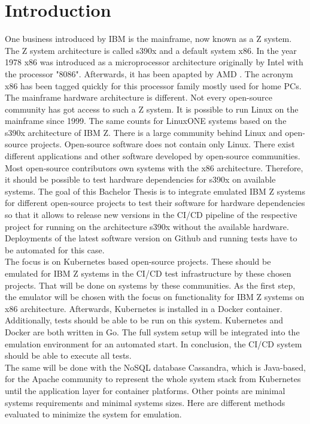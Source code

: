 \chapter{Introduction}\label{ch:intro}

One business introduced by IBM is the mainframe, now known as a Z system. The Z system architecture is called \gls{s390x} and a default system \gls{x86}. 
In the year 1978 x86 was introduced as a microprocessor architecture originally by Intel with the processor "8086". Afterwards, it has been apapted by AMD \cite{Ostler2020}. The acronym x86 has been tagged quickly for this processor family mostly used for home PCs. 
The mainframe hardware architecture is different. Not every open-source community has got access to such a Z system. It is possible to run Linux on the mainframe since 1999. The same counts for LinuxONE systems based on the s390x architecture of IBM Z. There is a large community behind Linux and open-source projects. Open-source software does not contain only \gls{Linux}. There exist different applications and other software developed by open-source communities. Most open-source contributors own systems with the x86 architecture. Therefore, it should be possible to test hardware dependencies for s390x on available systems. The goal of this Bachelor Thesis is to integrate emulated IBM Z systems for different open-source projects to test their software for hardware dependencies so that it allows to release new versions in the CI/CD pipeline of the respective project for running on the architecture s390x without the available hardware. Deployments of the latest software version on Github and running tests have to be automated for this case.\\
The focus is on Kubernetes based open-source projects. These should be emulated for IBM Z systems in the \gls{CI/CD} test infrastructure by these chosen projects. That will be done on systems by these communities. As the first step, the emulator will be chosen with the focus on functionality for IBM Z systems on x86 architecture. Afterwards, Kubernetes is installed in a Docker container. Additionally, tests should be able to be run on this system. Kubernetes and Docker are both written in Go. The full system setup will be integrated into the emulation environment for an automated start. In conclusion, the CI/CD system should be able to execute all tests. \\
The same will be done with the NoSQL database Cassandra, which is Java-based, for the Apache community to represent the whole system stack from Kubernetes until the \gls{application layer} for container platforms. Other points are minimal systems requirements and minimal systems sizes. Here are different methods evaluated to minimize the system for emulation.


